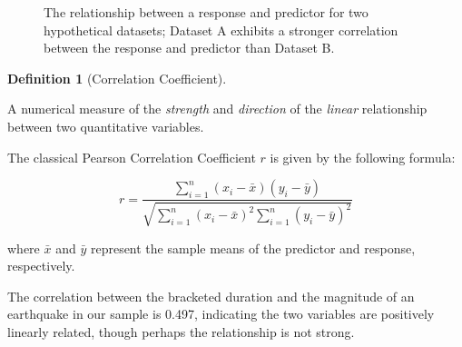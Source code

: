\documentclass[
  letterpaper,
  DIV=11,
  numbers=noendperiod]{scrreprt}
\theoremstyle{plain}
\theoremstyle{definition}
\theoremstyle{definition}
\newtheorem{definition}{Definition}[chapter]
\theoremstyle{remark}
\begin{document}
\begin{figure}


\caption{\label{fig-regsummaries-correlation}The relationship between a
response and predictor for two hypothetical datasets; Dataset A exhibits
a stronger correlation between the response and predictor than Dataset
B.}

\end{figure}%

\begin{definition}[Correlation
Coefficient]\protect\hypertarget{def-correlation-coefficient}{}\label{def-correlation-coefficient}

A numerical measure of the \emph{strength} and \emph{direction} of the
\emph{linear} relationship between two quantitative variables.

The classical Pearson Correlation Coefficient \(r\) is given by the
following formula:

\[r = \frac{\sum_{i=1}^{n} \left(x_i - \bar{x}\right)\left(y_i - \bar{y}\right)}{\sqrt{\sum_{i=1}^n \left(x_i - \bar{x}\right)^2 \sum_{i=1}^n \left(y_i - \bar{y}\right)^2}}\]

where \(\bar{x}\) and \(\bar{y}\) represent the sample means of the
predictor and response, respectively.

\end{definition}

The correlation between the bracketed duration and the magnitude of an
earthquake in our sample is 0.497, indicating the two variables are
positively linearly related, though perhaps the relationship is not
strong.
\end{document}
